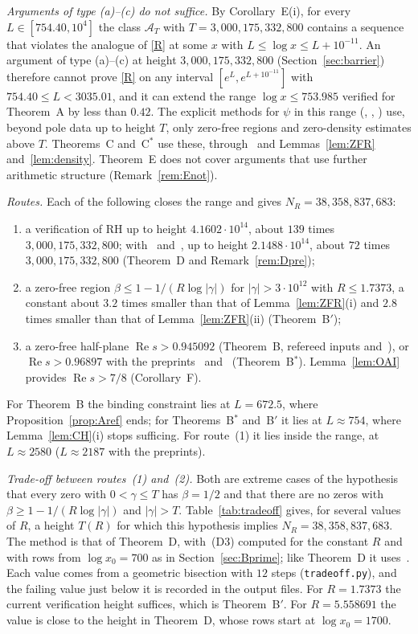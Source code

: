 \documentclass{amsart}
\theoremstyle{definition}
\theoremstyle{remark}
\theoremstyle{plain}
\numberwithin{equation}{section}
\newcommand{\NN}{38{,}358{,}837{,}683}
\newcommand{\HRH}{3{,}000{,}175{,}332{,}800}
\newcommand{\cA}{\mathcal{A}}
\newcommand{\TDhyp}{4.1602\cdot10^{14}}
\newcommand{\TDpre}{2.1488\cdot10^{14}}
\newcommand{\Cstar}{C$^*$}
\newcommand{\Bp}{B$'$}
\newcommand{\Bstar}{B$^*$}
\newcommand{\thetaB}{0.945092}
\begin{document}
\emph{Arguments of type (a)--(c) do not suffice.} By Corollary~E(i), for every $L\in[754.40,10^4]$ the class $\cA_T$ with $T=\HRH$ contains a sequence that violates the analogue of \eqref{R} at some $x$ with $L\le\log x\le L+10^{-11}$. An argument of type (a)--(c) at height $\HRH$ (Section~\ref{sec:barrier}) therefore cannot prove \eqref{R} on any interval $[e^L,e^{L+10^{-11}}]$ with $754.40\le L<3035.01$, and it can extend the range $\log x\le753.985$ verified for Theorem~A by less than $0.42$. The explicit methods for $\psi$ in this range (\cite{But16}, \cite{CH25}, \cite{BKLNW21,FKS23}) use, beyond pole data up to height $T$, only zero-free regions and zero-density estimates above $T$. Theorems~C and~\Cstar{} use these, through~\cite{FKS23} and Lemmas~\ref{lem:ZFR} and~\ref{lem:density}. Theorem~E does not cover arguments that use further arithmetic structure (Remark~\ref{rem:Enot}).

\emph{Routes.} Each of the following closes the range and gives $N_R=\NN$:
\begin{enumerate}
\item a verification of RH up to height $\TDhyp$, about $139$ times $\HRH$; with~\cite{BTY26} and~\cite{Bel24}, up to height $\TDpre$, about $72$ times $\HRH$ (Theorem~D and Remark~\ref{rem:Dpre});
\item a zero-free region $\beta\le1-1/(R\log|\gamma|)$ for $|\gamma|>3\cdot10^{12}$ with $R\le1.7373$, a constant about $3.2$ times smaller than that of Lemma~\ref{lem:ZFR}(i) and $2.8$ times smaller than that of Lemma~\ref{lem:ZFR}(ii) (Theorem~\Bp);
\item a zero-free half-plane $\operatorname{Re}s>\thetaB$ (Theorem~B, refereed inputs and~\cite{Bha24}), or $\operatorname{Re}s>0.96897$ with the preprints~\cite{FJ26} and~\cite{CH25} (Theorem~\Bstar). Lemma~\ref{lem:OAI} provides $\operatorname{Re}s>7/8$ (Corollary~F).
\end{enumerate}
For Theorem~B the binding constraint lies at $L=672.5$, where Proposition~\ref{prop:Aref} ends; for Theorems~\Bstar{} and~\Bp{} it lies at $L\approx754$, where Lemma~\ref{lem:CH}(i) stops sufficing. For route~(1) it lies inside the range, at $L\approx2580$ ($L\approx2187$ with the preprints).

\emph{Trade-off between routes~(1) and~(2).} Both are extreme cases of the hypothesis that every zero with $0<\gamma\le T$ has $\beta=1/2$ and that there are no zeros with $\beta\ge1-1/(R\log|\gamma|)$ and $|\gamma|>T$. Table~\ref{tab:tradeoff} gives, for several values of $R$, a height $T(R)$ for which this hypothesis implies $N_R=\NN$. The method is that of Theorem~D, with~(D3) computed for the constant $R$ and with rows from $\log x_0=700$ as in Section~\ref{sec:Bprime}; like Theorem~D it uses~\cite{CH25}. Each value comes from a geometric bisection with $12$ steps (\texttt{tradeoff.py}), and the failing value just below it is recorded in the output files. For $R=1.7373$ the current verification height suffices, which is Theorem~\Bp. For $R=5.558691$ the value is close to the height in Theorem~D, whose rows start at $\log x_0=1700$.
\end{document}
